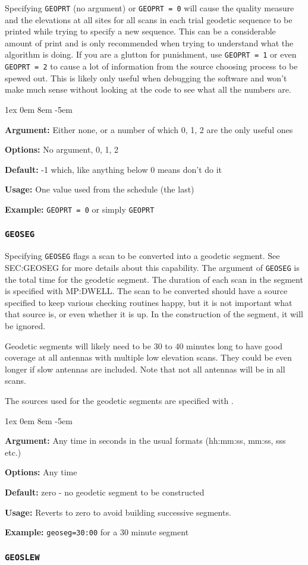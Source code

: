 \documentclass{report}
\newcommand{\rcwbox}[5]{
  \begin{list}{}{\parsep 1ex  \itemsep 0em
                 \leftmargin 8em  \itemindent -5em }
    \item {\bf Argument:} #1
    \item {\bf Options:}  #2
    \item {\bf Default:}  #3
    \item {\bf Usage:}    #4
    \item {\bf Example:}  #5
  \end{list}
}
\begin{document}
Specifying {\tt GEOPRT} (no argument) or {\tt GEOPRT = 0}
will cause the quality measure and the elevations at all sites for all
scans in each trial geodetic sequence to be printed while trying to
specify a new sequence.  This can be a considerable amount of print
and is only recommended when trying to understand what the algorithm
is doing.  If you are a glutton for punishment, use {\tt GEOPRT = 1}
or even {\tt GEOPRT = 2} to cause a lot of information from the source
choosing process to be spewed out.  This is likely only useful when
debugging the software and won't make much sense without looking at
the code to see what all the numbers are.

\rcwbox
{Either none, or a number of which 0, 1, 2 are the only useful ones}
{No argument, 0, 1, 2}
{-1 which, like anything below 0 means don't do it}
{One value used from the schedule (the last)}
{{\tt GEOPRT = 0} or simply {\tt GEOPRT}}


\subsubsection{\label{MP:GEOSEG}{\tt GEOSEG}}

Specifying {\tt GEOSEG} flags a scan to be converted into a geodetic
segment.  See 
{SEC:GEOSEG} for more details about this capability.  The argument
of {\tt GEOSEG} is the total time for the geodetic segment.  The duration
of each scan in the segment is specified with 
{MP:DWELL}.  The scan to be converted should have a source specified
to keep various checking routines happy, but it is not important what
that source is, or even whether it is up.  In the construction of the
segment, it will be ignored.

Geodetic segments will likely need to be 30 to 40 minutes long to have
good coverage at all antennas with multiple low elevation scans.  They
could be even longer if slow antennas are included.  Note that not all
antennas will be in all scans.

The sources used for the geodetic segments are specified with
.

\rcwbox
{Any time in seconds in the usual formats (hh:mm:ss, mm:ss, sss etc.)}
{Any time}
{zero - no geodetic segment to be constructed}
{Reverts to zero to avoid building successive segments.}
{{\tt geoseg=30:00} for a 30 minute segment}

\subsubsection{\label{MP:GEOSLEW}{\tt GEOSLEW}}
\end{document}
